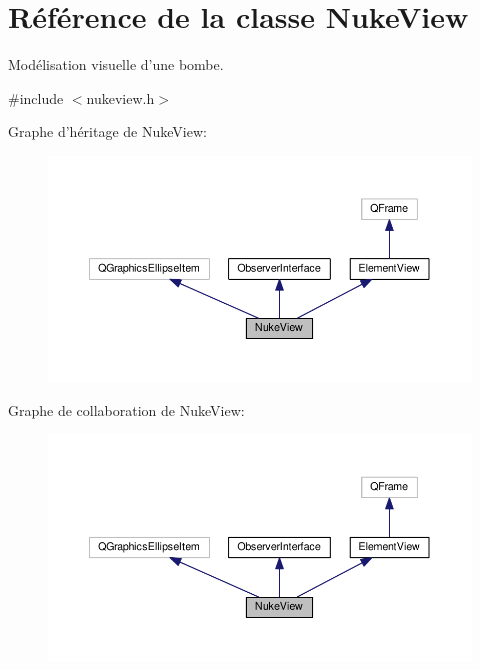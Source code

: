 \hypertarget{classNukeView}{\section{Référence de la classe Nuke\+View}
\label{classNukeView}
}


Modélisation visuelle d’une bombe.  




{\ttfamily \#include $<$nukeview.\+h$>$}



Graphe d'héritage de Nuke\+View\+:\nopagebreak
\begin{figure}[H]
\begin{center}
\leavevmode
\includegraphics[width=350pt]{da/d21/classNukeView__inherit__graph}
\end{center}
\end{figure}


Graphe de collaboration de Nuke\+View\+:\nopagebreak
\begin{figure}[H]
\begin{center}
\leavevmode
\includegraphics[width=350pt]{db/d47/classNukeView__coll__graph}
\end{center}
\end{figure}
